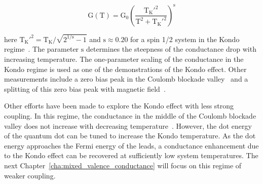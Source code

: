 \begin{equation}\label{eq:kondo_conductance}
 \mathrm{G(T)} =
 \mathrm{G_0}
 \left(
 \frac{\mathrm{T_K'^{2}}}{\mathrm{T^2} + \mathrm{T_K'^{2}}}
 \right)^\mathrm{s}
\end{equation}

\noindent here $\mathrm{T_K'^{2}} = \mathrm{T_K}/\sqrt{2^{\mathrm{1/s}}-1}$ and $\mathrm{s} \approx 0.20$ for a spin 1/2 system in the Kondo regime~\cite{goldhaber_mv}. The parameter $\mathrm{s}$ determines the steepness of the conductance drop with increasing temperature. The one-parameter scaling of the conductance in the Kondo regime is used as one of the demonstrations of the Kondo effect. Other measurements include a zero bias peak in the Coulomb blockade valley~\cite{kondo_unitary} and a splitting of this zero bias peak with magnetic field~\cite{cronenwett_tunable_kondo}. 

Other efforts have been made to explore the Kondo effect with less strong coupling. In this regime, the conductance in the middle of the Coulomb blockade valley does not increase with decreasing temperature~\cite{goldhaber_mv}. However, the dot energy of the quantum dot can be tuned to increase the Kondo temperature. As the dot energy approaches the Fermi energy of the leads, a conductance enhancement due to the Kondo effect can be recovered at sufficiently low system temperatures. The next Chapter~\ref{cha:mixed_valence_conductance} will focus on this regime of weaker coupling.


